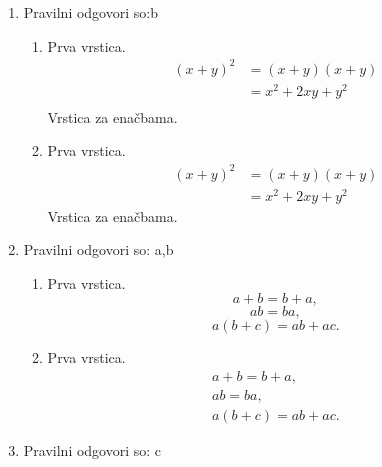 \documentclass[11pt]{article}
\begin{document}
\begin{enumerate}
    \item Pravilni odgovori so:b %
    \begin{enumerate}
        \item Prva vrstica.
\begin{align*}
  (x + y)^2 &= (x + y)(x + y) \\
  &= x^2 + 2 x y + y^2 \\
\end{align*}
        Vrstica za enačbama.
        \item Prva vrstica.
\begin{align*}
  (x + y)^2 &= (x + y)(x + y) \\
  &= x^2 + 2 x y + y^2
\end{align*}
        Vrstica za enačbama.
    \end{enumerate}

    \item Pravilni odgovori so: a,b%
    \begin{enumerate}
        \item Prva vrstica.
\[ a + b = b + a, \]
\[ a b = b a, \]
\[ a (b + c) = a b + a c. \]
        \item Prva vrstica.
\begin{gather*}
  a + b = b + a, \\
  a b = b a, \\
  a (b + c) = a b + a c.
\end{gather*}
    \end{enumerate}

    \item Pravilni odgovori so: c%

\end{enumerate}
\end{document}

